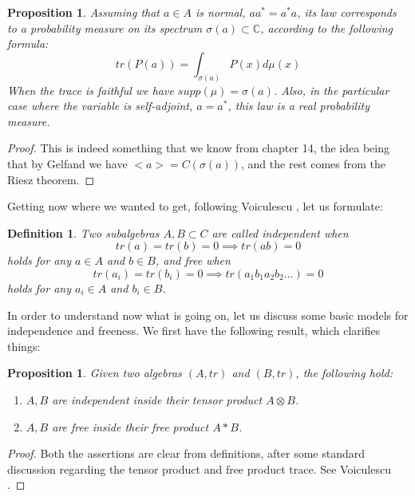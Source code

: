 \documentclass[12pt]{amsbook}
\newtheorem{definition}[theorem]{Definition}
\newtheorem{proposition}[theorem]{Proposition}
\begin{document}

\begin{proposition}
Assuming that $a\in A$ is normal, $aa^*=a^*a$, its law corresponds to a probability measure on its spectrum $\sigma(a)\subset\mathbb C$, according to the following formula:
$$tr(P(a))=\int_{\sigma(a)}P(x)d\mu(x)$$
When the trace is faithful we have $supp(\mu)=\sigma(a)$. Also, in the particular case where the variable is self-adjoint, $a=a^*$, this law is a real probability measure.
\end{proposition}

\begin{proof}
This is indeed something that we know from chapter 14, the idea being that by Gelfand we have $<a>=C(\sigma(a))$, and the rest comes from the Riesz theorem.
\end{proof}

Getting now where we wanted to get, following Voiculescu \cite{vdn}, let us formulate:


\begin{definition}
Two subalgebras $A,B\subset C$ are called independent when
$$tr(a)=tr(b)=0\implies tr(ab)=0$$
holds for any $a\in A$ and $b\in B$, and free when
$$tr(a_i)=tr(b_i)=0\implies tr(a_1b_1a_2b_2\ldots)=0$$
holds for any $a_i\in A$ and $b_i\in B$.
\end{definition}
 
In order to understand now what is going on, let us discuss some basic models for independence and freeness. We first have the following result, which clarifies things:

\begin{proposition}
Given two algebras $(A,tr)$ and $(B,tr)$, the following hold:
\begin{enumerate}
\item $A,B$ are independent inside their tensor product $A\otimes B$.

\item $A,B$ are free inside their free product $A*B$.
\end{enumerate}
\end{proposition}

\begin{proof}
Both the assertions are clear from definitions, after some standard discussion regarding the tensor product and free product trace. See Voiculescu \cite{vdn}.
\end{proof}
\end{document}

